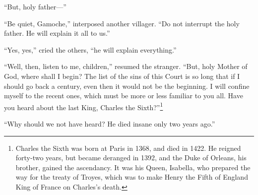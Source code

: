 ``But, holy father---''

``Be quiet, Gamoche,'' interposed another villager. ``Do not interrupt
the holy father. He will explain it all to us.''

``Yes, yes,'' cried the others, ``he will explain everything.''

``Well, then, listen to me, children,'' resumed the stranger. ``But,
holy Mother of God, where shall I begin? The list of the sins of this
Court is so long that if I should go back a century, even then it would
not be the beginning. I will confine myself to the recent ones, which
must be more or less familiar to you all. Have you heard about the last
King, Charles the Sixth?''\footnote{Charles the Sixth was born at Paris
  in 1368, and died in 1422. He reigned forty-two years, but became
  deranged in 1392, and the Duke of Orleans, his brother, gained the
  ascendancy. It was his Queen, Isabella, who prepared the way for the
  treaty of Troyes, which was to make Henry the Fifth of England King of
  France on Charles's death.}

``Why should we not have heard? He died insane only two years ago.''

